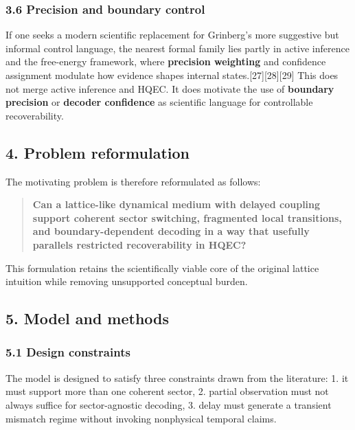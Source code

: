 \documentclass[
]{article}
\begin{document}
\subsubsection{3.6 Precision and boundary
control}\label{precision-and-boundary-control}

If one seeks a modern scientific replacement for Grinberg's more
suggestive but informal control language, the nearest formal family lies
partly in active inference and the free-energy framework, where
\textbf{precision weighting} and confidence assignment modulate how
evidence shapes internal states.{[}27{]}{[}28{]}{[}29{]} This does not
merge active inference and HQEC. It does motivate the use of
\textbf{boundary precision} or \textbf{decoder confidence} as scientific
language for controllable recoverability.

\subsection{4. Problem reformulation}\label{problem-reformulation}

The motivating problem is therefore reformulated as follows:

\begin{quote}
\textbf{Can a lattice-like dynamical medium with delayed coupling
support coherent sector switching, fragmented local transitions, and
boundary-dependent decoding in a way that usefully parallels restricted
recoverability in HQEC?}
\end{quote}

This formulation retains the scientifically viable core of the original
lattice intuition while removing unsupported conceptual burden.

\subsection{5. Model and methods}\label{model-and-methods}

\subsubsection{5.1 Design constraints}\label{design-constraints}

The model is designed to satisfy three constraints drawn from the
literature: 1. it must support more than one coherent sector, 2. partial
observation must not always suffice for sector-agnostic decoding, 3.
delay must generate a transient mismatch regime without invoking
nonphysical temporal claims.
\end{document}

